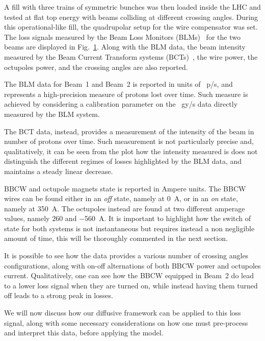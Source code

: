 A fill with three trains of symmetric bunches was then loaded inside the LHC and tested at flat top energy with beams colliding at different crossing angles. During this operational-like fill, the quadrupolar setup for the wire compensator was set. The loss signals measured by the Beam Loss Monitors (BLMs)~\cite{} for the two beams are displayed in Fig.~\ref{fig:wire-data}. Along with the BLM data, the beam intensity measured by the Beam Current Transform systems (BCTs)~\cite{}, the wire power, the octupoles power, and the crossing angles are also reported. 

\begin{figure}
    \centering
    \caption{}
    \label{fig:wire-data}
\end{figure}

The BLM data for Beam~1 and Beam~2 is reported in units of \SI{}{p/s}, and represents a high-precision measure of protons lost over time. Such measure is achieved by considering a calibration parameter on the \SI{}{gy/s} data directly measured by the BLM system.

The BCT data, instead, provides a measurement of the intensity of the beam in number of protons over time. Such measurement is not particularly precise and, qualitatively, it can be seen from the plot how the intensity measured is does not distinguish the different regimes of losses highlighted by the BLM data, and maintains a steady linear decrease.

BBCW and octupole magnets state is reported in Ampere units. The BBCW wires can be found either in an \textit{off} state, namely at \SI{0}{\ampere}, or in an \textit{on} state, namely at \SI{350}{\ampere}. The octupoles instead are found at two different amperage values, namely $260$ and \SI{-560}{\ampere}. It is important to highlight how the switch of state for both systems is not instantaneous but requires instead a non negligible amount of time, this will be thoroughly commented in the next section.

It is possible to see how the data provides a various number of crossing angles configurations, along with on-off alternations of both BBCW power and octupoles current. Qualitatively, one can see how the BBCW equipped in Beam~2 do lead to a lower loss signal when they are turned on, while instead having them turned off leads to a strong peak in losses.

We will now discuss how our diffusive framework can be applied to this loss signal, along with some necessary considerations on how one must pre-process and interpret this data, before applying the model. 

